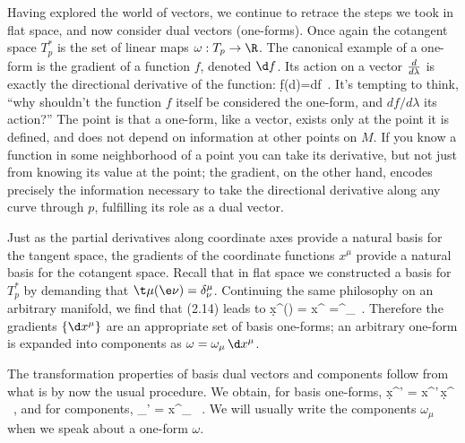 \begin{figure}[h]
  \centerline{
  }
\end{figure}

Having explored the world of vectors, we continue to retrace the steps
we took in flat space, and now consider dual vectors (one-forms).
Once again the cotangent space $T^*_p$ is the set of linear maps
$\omega:T_p\rightarrow\R$.  The canonical example of a one-form is
the gradient of a function $f$, denoted $\d f$.  Its action on a
vector ${d\over{d\lambda}}$ is exactly the directional derivative of
the function:
\be
  \d f\left({d}\right)={{df}}\ .\label{2.14}
\ee
It's tempting to think, ``why shouldn't the function $f$ itself be 
considered the one-form, and $df/d\lambda$ its action?''  The point
is that a one-form, like a vector, exists only at the point it
is defined, and does not depend on information at other points on $M$.
If you know a function in some neighborhood of a point you can take
its derivative, but not just from knowing its value at the point;
the gradient, on the other hand, encodes precisely the
information necessary to take the directional derivative along any curve
through $p$, fulfilling its role as a dual vector.

Just as the partial derivatives along coordinate axes provide a natural
basis for the tangent space, the gradients of the coordinate functions
$x^\mu$ provide a natural basis for the cotangent space.  Recall that in
flat space we constructed a basis for $T^*_p$ by demanding that
$\t\mu(\e\nu)=\delta^\mu_\nu$.  Continuing the same philosophy on an
arbitrary manifold, we find that (2.14) leads to
\be
  \d x^\mu(\p\nu) = {{\partial x^\mu}} 
  =\delta^\mu_\nu\ .\label{2.15}
\ee
Therefore the gradients $\{\d x^\mu\}$ are an appropriate set of
basis one-forms; an arbitrary one-form is expanded into components
as $\omega = \omega_\mu\,\d x^\mu$.

The transformation properties of basis dual vectors and components
follow from what is by now the usual procedure.  We obtain, for
basis one-forms,
\be
  \d x^{\mu'} = {{\partial x^{\mu'}}}\,\d x^\mu
  \  ,\label{2.16}
\ee
and for components,
\be
  \omega_{\mu'} = {{\partial x^{\mu}}}\omega_\mu
  \ .\label{2.17}
\ee
We will usually write the components $\omega_\mu$ when we speak about a
one-form $\omega$.


